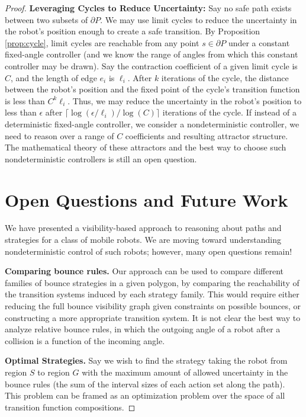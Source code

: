 \documentclass[]{styles/svproc}  %
\begin{document}
\begin{proof}
\textbf{Leveraging Cycles to Reduce Uncertainty:}
Say no safe path exists between two subsets of $\partial P$. We may
use limit cycles to reduce the uncertainty in the robot's position enough to
create a safe transition. By Proposition \ref{prop:cycle}, limit cycles are reachable from any point $s
\in \partial P$ under a constant fixed-angle controller (and we know the range
of angles from which this constant controller may be drawn). Say the contraction 
coefficient of a given limit cycle is $C$, and the length of edge $e_i$ is
$\ell_i$. After $k$ iterations of the cycle,
the distance between the robot's position and the fixed point of the cycle's transition
function is less than $C^k \ell_i$. Thus,
we may reduce the uncertainty in the robot's position to less than $\epsilon$
after $\lceil \log(\epsilon/\ell_i)/\log(C) \rceil$ iterations of the 
cycle. If instead of a deterministic fixed-angle controller, we consider a
nondeterministic controller, we need to
reason over a range of $C$ coefficients and resulting attractor structure. 
The mathematical theory of these attractors and the best way to choose such
nondeterministic controllers is still an open question.


\section{Open Questions and Future Work}

We have presented a visibility-based approach to reasoning about 
paths and strategies for a class of mobile robots. We are moving toward
understanding nondeterministic control of such robots; however, many open
questions remain!

\textbf{Comparing bounce rules.} Our approach can be used to compare different families of
bounce strategies in a given polygon, by comparing the reachability of the
transition systems induced by each strategy family. This would require 
either reducing the full bounce visibility graph given constraints on
possible bounces, or constructing a more appropriate transition
system. It is not clear the best way to analyze relative bounce rules, in which the
outgoing angle of a robot after a collision is a function of the incoming angle.


\textbf{Optimal Strategies.} Say we wish to
find the strategy taking the robot from region $S$ to region $G$ with the
maximum amount of allowed uncertainty in the bounce rules (the sum of the
interval sizes of each action set along the path). This problem can be framed as
an optimization problem over the space of all transition function compositions.


\end{proof}
\end{document}
